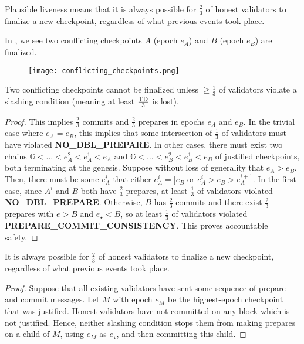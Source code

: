 \documentclass[12pt, final]{article}
\newcommand{\epoch}{\ensuremath{e}\xspace}
\newcommand{\epochsource}{\ensuremath{\epoch_{\star}}\xspace}
\newcommand{\totaldeposit}{\textnormal{TD}\xspace}
\newcommand{\Genesisblock}{\ensuremath{\mathds{G}}\xspace}
\begin{document}
Plausible liveness means that it is always possible for $\frac{2}{3}$ of honest validators to finalize a new checkpoint, regardless of what previous events took place.

In , we see two conflicting checkpoints $A$ (epoch $e_A$) and $B$ (epoch $e_B$) are finalized.

\begin{figure}[h!tb]
\centering
    \texttt{[image: conflicting\_checkpoints.png]}
\caption{}
\label{fig:conflicting_checkpoints}
\end{figure}


\begin{theorem}
\label{theorem:safety}
Two conflicting checkpoints cannot be finalized unless $\geq \frac{1}{3}$ of validators violate a slashing condition (meaning at least $\frac{\totaldeposit}{3}$ is lost).

\begin{proof}
This implies $\frac{2}{3}$ commits and $\frac{2}{3}$ prepares in epochs $\epoch_A$ and $e_B$. In the trivial case where $\epoch_A = \epoch_B$, this implies that some intersection of $\frac{1}{3}$ of validators must have violated \textbf{NO\_DBL\_PREPARE}. In other cases, there must exist two chains $\Genesisblock < \ldots < \epoch_A^2 < \epoch_A^1 < \epoch_A$ and $\Genesisblock < \ldots < \epoch_B^2 < \epoch_B^1 < \epoch_B$ of justified checkpoints, both terminating at the genesis. Suppose without loss of generality that $\epoch_A > \epoch_B$. Then, there must be some $\epoch_A^i$ that either $\epoch_A^i = ]\epoch_B$ or $\epoch_A^i > \epoch_B > \epoch_A^{i+1}$. In the first case, since $A^i$ and $B$ both have $\frac{2}{3}$ prepares, at least $\frac{1}{3}$ of validators violated \textbf{NO\_DBL\_PREPARE}. Otherwise, $B$ has $\frac{2}{3}$ commits and there exist $\frac{2}{3}$ prepares with $\epoch > B$ and $\epochsource < B$, so at least $\frac{1}{3}$ of validators violated \textbf{PREPARE\_COMMIT\_CONSISTENCY}. This proves accountable safety.
\end{proof}
\end{theorem}




\begin{theorem}
\label{theorem:liveness}
It is always possible for $\frac{2}{3}$ of honest validators to finalize a new checkpoint, regardless of what previous events took place.

\begin{proof}
Suppose that all existing validators have sent some sequence of prepare and commit messages. Let $M$ with epoch $\epoch_M$ be the highest-epoch checkpoint that was justified. Honest validators have not committed on any block which is not justified. Hence, neither slashing condition stops them from making prepares on a child of $M$, using $\epoch_M$ as $\epochsource$, and then committing this child.
\end{proof}

\end{theorem}
\end{document}

